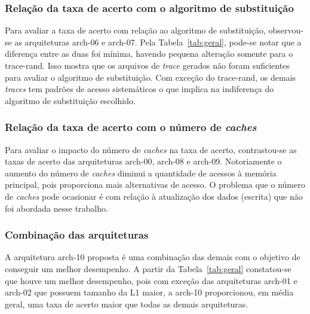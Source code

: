 \newpage
\subsubsection{Relação da taxa de acerto com o algoritmo de substituição}

Para avaliar a taxa de acerto com relação ao algoritmo de substituição, observou-se as arquiteturas arch-06 e arch-07. Pela Tabela~\ref{tab:geral}, pode-se notar que a diferença entre as duas foi mínima, havendo pequena alteração somente para o trace-rand. Isso mostra que os arquivos de \textit{trace} gerados não foram suficientes para avaliar o algoritmo de substituição. Com exceção do trace-rand, os demais \textit{traces} tem padrões de acesso sistemáticos o que implica na indiferença do algoritmo de substituição escolhido.

\subsubsection{Relação da taxa de acerto com o número de \textit{caches}}

Para avaliar o impacto do número de \textit{caches} na taxa de acerto, contrastou-se as taxas de acerto das arquiteturas arch-00, arch-08 e arch-09. Notoriamente o aumento do número de \textit{caches} diminui a quantidade de acessos à memória principal, pois proporciona mais alternativas de acesso. O problema que o número de \textit{caches} pode ocasionar é com relação à atualização dos dados (escrita) que não foi abordada nesse trabalho.

\subsubsection{Combinação das arquiteturas}

A arquitetura arch-10 proposta é uma combinação das demais com o objetivo de conseguir um melhor desempenho. A partir da Tabela~\ref{tab:geral} constatou-se que houve um melhor desempenho, pois com exceção das arquiteturas arch-01 e arch-02 que possuem tamanho da L1 maior, a arch-10 proporcionou, em média geral, uma taxa de acerto maior que todas as demais arquiteturas.